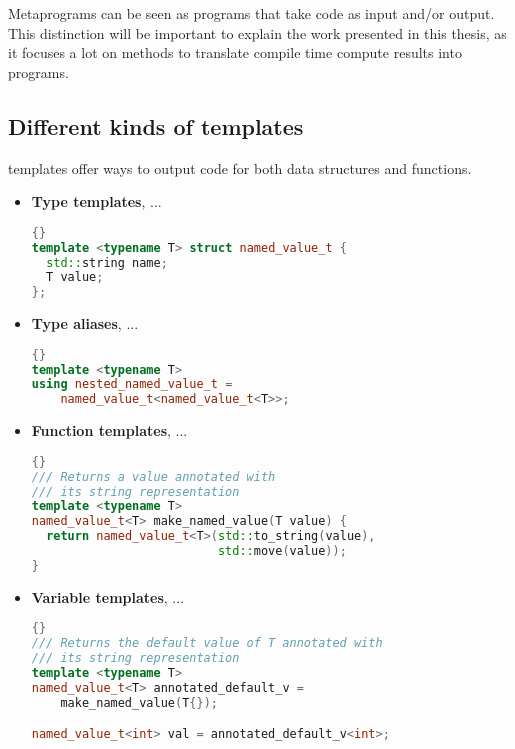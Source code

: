 \documentclass[../main]{subfiles}
\begin{document}
Metaprograms can be seen as programs that take code as input and/or output.
This distinction will be important to explain the work presented in
this thesis, as it focuses a lot on methods to translate
compile time compute results into \cpp programs.

\subsection{
  Different kinds of templates
}

\cpp templates offer ways to output code for both data structures
and functions.

\begin{itemize}
\item \textbf{Type templates}, ... %

\begin{lstlisting}[language=c++]{}
template <typename T> struct named_value_t {
  std::string name;
  T value;
};
\end{lstlisting}

\item \textbf{Type aliases}, ... %

\begin{lstlisting}[language=c++]{}
template <typename T>
using nested_named_value_t =
    named_value_t<named_value_t<T>>;
\end{lstlisting}

\item \textbf{Function templates}, ... %

\begin{lstlisting}[language=c++]{}
/// Returns a value annotated with
/// its string representation
template <typename T>
named_value_t<T> make_named_value(T value) {
  return named_value_t<T>(std::to_string(value),
                          std::move(value));
}
\end{lstlisting}

\item \textbf{Variable templates}, ... %

\begin{lstlisting}[language=c++]{}
/// Returns the default value of T annotated with
/// its string representation
template <typename T>
named_value_t<T> annotated_default_v =
    make_named_value(T{});

named_value_t<int> val = annotated_default_v<int>;
\end{lstlisting}

\end{itemize}
\end{document}
